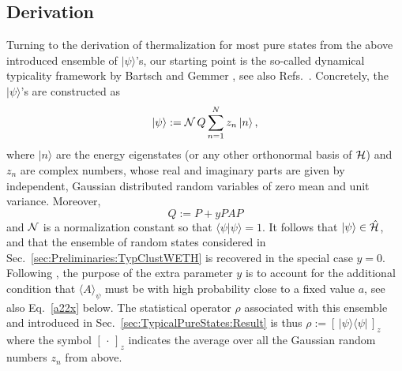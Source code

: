 \documentclass[twocolumn,aps,prb,floatfix,superscriptaddress]{revtex4-2}
\newcommand{\ket}[1]{\lvert #1 \rangle} 	%
\newcommand{\<}{\left\langle}	%
\renewcommand{\>}{\right\rangle}	%
\newcommand{\hr}{{\cal H}}
\begin{document}
\subsection{Derivation}
\label{sec:TypicalPureStates:Derivation}

Turning to the derivation of
thermalization for most pure states from the above introduced ensemble of $\ket\psi$'s,
our
starting point is the so-called dynamical typicality 
framework by Bartsch and Gemmer \cite{bar09},
see also Refs.~\cite{rei18a,rei20}.
Concretely, the $\ket\psi$'s are constructed as
\begin{equation}
\label{eq:psi}
	|\psi\rangle:={\cal{N}}\, Q \sum_{n=1}^N z_n \, |n\rangle \,,
\end{equation}
where $|n\rangle$ are the energy eigenstates 
(or any other orthonormal basis of $\hr$)
and $z_n$ are complex numbers,
whose real and imaginary parts are 
given by independent, Gaussian 
distributed random variables of 
zero mean and unit variance.
Moreover,
\begin{equation}
\label{eq:Q}
	Q := P + y P A P
\end{equation}
and ${\cal{N}}$ is a normalization 
constant so that 
$\langle\psi|\psi\rangle =1$.
It follows that $|\psi\rangle\in\hat \hr$, and  
that the ensemble of random states considered in
Sec.~\ref{sec:Preliminaries:TypClustWETH}
is recovered in the special case $y=0$.
Following \cite{bar09}, the purpose of the extra parameter $y$ is  
to account for the additional condition that $\langle A\rangle_{\!\psi}$
must be with high probability close to a fixed value $a$, see
also
Eq.~\eqref{a22x} below.
The statistical operator $\rho$ associated with this ensemble and introduced in Sec.~\ref{sec:TypicalPureStates:Result} is thus
$\rho:=[\,|\psi\rangle\langle\psi |\,]_z$ where the symbol $[\,\cdot\, ]_z$ 
indicates 
the average over all the Gaussian
random numbers $z_n$ from above.
\end{document}
